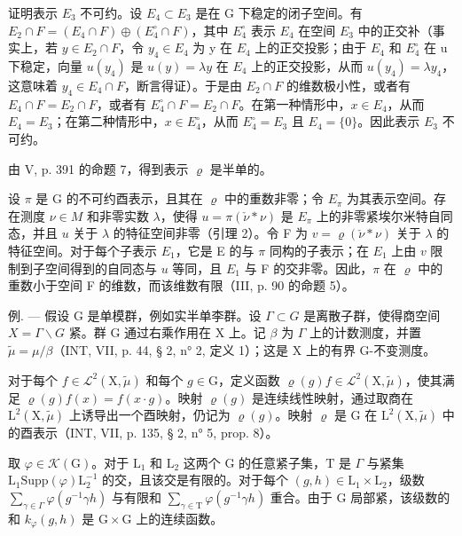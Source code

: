 证明表示 \(E_{3}\) 不可约。设 \(E_{4} \subset E_{3}\) 是在 G 下稳定的闭子空间。有 \(E_{2} \cap F = (E_{4} \cap F) \oplus (E_{4}^{\circ} \cap F)\)，其中 \(E_{4}^{\circ}\) 表示 \(E_{4}\) 在空间 \(E_{3}\) 中的正交补（事实上，若 \(y \in E_{2} \cap F\)，令 \(y_{4} \in E_{4}\) 为 y 在 \(E_{4}\) 上的正交投影；由于 \(E_{4}\) 和 \(E_{4}^{\circ}\) 在 u 下稳定，向量 \(u(y_{4})\) 是 \(u(y) = \lambda y\) 在 \(E_{4}\) 上的正交投影，从而 \(u(y_{4}) = \lambda y_{4}\)，这意味着 \(y_{4} \in E_{4} \cap F\)，断言得证）。于是由 \(E_{2} \cap F\) 的维数极小性，或者有 \(E_{4} \cap F = E_{2} \cap F\)，或者有 \(E_{4}^{\circ} \cap F = E_{2} \cap F\)。在第一种情形中，\(x \in E_{4}\)，从而 \(E_{4} = E_{3}\)；在第二种情形中，\(x \in E_{4}^{\circ}\)，从而 \(E_{4}^{\circ} = E_{3}\) 且 \(E_{4} = \{0\}\)。因此表示 \(E_{3}\) 不可约。

由 V, p. 391 的命题 7，得到表示 \(\varrho\) 是半单的。

设 \(\pi\) 是 G 的不可约酉表示，且其在 \(\varrho\) 中的重数非零；令 \(E_{\pi}\) 为其表示空间。存在测度 \(\nu \in M\) 和非零实数 \(\lambda\)，使得 \(u = \pi (\check{\nu} * \nu)\) 是 \(E_{\pi}\) 上的非零紧埃尔米特自同态，并且 \(u\) 关于 \(\lambda\) 的特征空间非零（引理 2）。令 F 为 \(v = \varrho (\check{\nu} * \nu)\) 关于 \(\lambda\) 的特征空间。对于每个子表示 \(E_1\)，它是 E 的与 \(\pi\) 同构的子表示；在 \(E_1\) 上由 \(v\) 限制到子空间得到的自同态与 \(u\) 等同，且 \(E_1\) 与 F 的交非零。因此，\(\pi\) 在 \(\varrho\) 中的重数小于空间 F 的维数，而该维数有限（III, p. 90 的命题 5）。

例. --- 假设 G 是单模群，例如实半单李群。设 \(\Gamma \subset G\) 是离散子群，使得商空间 \(X = \Gamma \backslash G\) 紧。群 G 通过右乘作用在 X 上。记 \(\beta\) 为 \(\Gamma\) 上的计数测度，并置 \(\widetilde{\mu} = \mu / \beta\)（INT, VII, p. 44, § 2, n° 2, 定义 1）；这是 X 上的有界 G-不变测度。

对于每个 \(f \in \mathcal{L}^2(\mathrm{X},\widetilde{\mu})\) 和每个 \(g \in \mathrm{G}\)，定义函数 \(\varrho(g)f \in \mathcal{L}^2(\mathrm{X},\widetilde{\mu})\)，使其满足 \(\varrho(g)f(x) = f(x \cdot g)\)。映射 \(\varrho(g)\) 是连续线性映射，通过取商在 \(\mathrm{L}^2(\mathrm{X},\widetilde{\mu})\) 上诱导出一个酉映射，仍记为 \(\varrho(g)\)。映射 \(\varrho\) 是 G 在 \(\mathrm{L}^2(\mathrm{X},\widetilde{\mu})\) 中的酉表示（INT, VII, p. 135, § 2, n° 5, prop. 8）。

取 \(\varphi \in \mathcal{K}(\mathrm{G})\)。对于 \(\mathrm{L}_1\) 和 \(\mathrm{L}_2\) 这两个 \(\mathrm{G}\) 的任意紧子集，\(\mathrm{T}\) 是 \(\Gamma\) 与紧集 \(\mathrm{L}_1\mathrm{Supp}(\varphi)\mathrm{L}_2^{-1}\) 的交，且该交是有限的。对于每个 \((g,h) \in \mathrm{L}_1 \times \mathrm{L}_2\)，级数 \(\sum_{\gamma \in \Gamma} \varphi(g^{-1}\gamma h)\) 与有限和 \(\sum_{\gamma \in \mathrm{T}} \varphi(g^{-1}\gamma h)\) 重合。由于 \(\mathrm{G}\) 局部紧，该级数的和 \(k_{\varphi}(g,h)\) 是 \(\mathrm{G} \times \mathrm{G}\) 上的连续函数。

